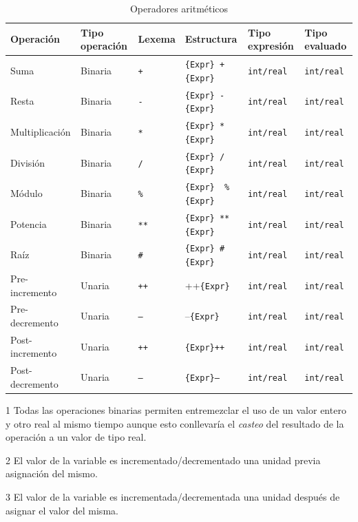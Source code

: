 \documentclass[11pt, english]{article}
\begin{document}
\begin{table}[H]
	\begin{center}
		\caption{Operadores aritméticos}\label{tab:arithmetic}
		\begin{threeparttable}
			\begin{tabular}{l|l|l|l|l|l}
				\toprule
				\textbf{Operación} & \textbf{Tipo operación} & \textbf{Lexema} & \textbf{Estructura} & \textbf{Tipo expresión} & \textbf{Tipo evaluado} \tnote{1}\\
				\midrule
				Suma  & Binaria & \texttt{+} & \texttt{\{Expr\} + \{Expr\}} & \texttt{int/real} & \texttt{int/real}\\
				Resta & Binaria & \texttt{-} & \texttt{\{Expr\} - \{Expr\}} & \texttt{int/real} & \texttt{int/real}\\
				Multiplicación & Binaria & \texttt{*} & \texttt{\{Expr\} * \{Expr\}} & \texttt{int/real} & \texttt{int/real}\\
				División & Binaria & \texttt{/} & \texttt{\{Expr\} / \{Expr\}} & \texttt{int/real} & \texttt{int/real}\\
				Módulo & Binaria & \texttt{\%} & \texttt{\{Expr\}\, \% \{Expr\}} & \texttt{int/real} & \texttt{int/real}\\
				Potencia & Binaria & \texttt{**} & \texttt{\{Expr\} ** \{Expr\}} & \texttt{int/real} & \texttt{int/real}\\
				Raíz & Binaria & \texttt{\#} & \texttt{\{Expr\} \# \{Expr\}} & \texttt{int/real} & \texttt{int/real}\\
				Pre-incremento \tnote{2} & Unaria & \texttt{++} & ++\texttt{\{Expr\}} & \texttt{int/real} & \texttt{int/real}\\
				Pre-decremento \tnote{2} & Unaria & \texttt{--} & --\texttt{\{Expr\}} & \texttt{int/real} & \texttt{int/real}\\
				Post-incremento \tnote{3} & Unaria & \texttt{++} & \texttt{\{Expr\}++} & \texttt{int/real} & \texttt{int/real}\\
				Post-decremento \tnote{3} & Unaria & \texttt{--} & \texttt{\{Expr\}--} & \texttt{int/real} & \texttt{int/real}\\
				\bottomrule
			\end{tabular}
			\begin{tablenotes}
				\small
				\item[1] Todas las operaciones binarias permiten entremezclar el uso de un valor entero y otro real al mismo tiempo aunque esto conllevaría el \textit{casteo} del resultado de la operación a un valor de tipo real.
				\item [2] El valor de la variable es incrementado/decrementado una unidad previa asignación del mismo.
				\item[3] El valor de la variable es incrementada/decrementada una unidad después de asignar el valor del misma.
			\end{tablenotes}
		\end{threeparttable}
	\end{center}
\end{table}
\end{document}
